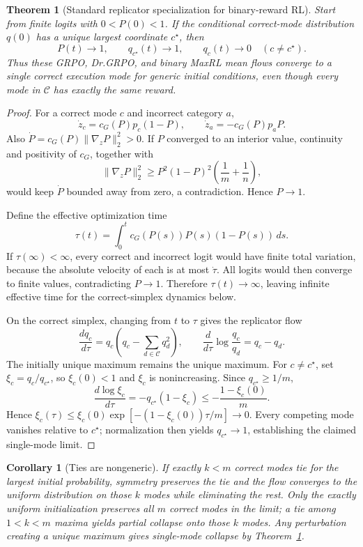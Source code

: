 \documentclass{article}
\newcommand{\1}{\mathbf 1}
\newtheorem{theorem}[lemma]{Theorem}
\newtheorem{corollary}[lemma]{Corollary}
\theoremstyle{remark}
\theoremstyle{definition}
\theoremstyle{plain}
\begin{document}
\begin{theorem}[Standard replicator specialization for binary-reward RL]
\label{thm:grpo-collapse}
Start from finite logits with $0<P(0)<1$. If the conditional correct-mode
distribution $q(0)$ has a unique largest coordinate $c^\star$, then
\[
  P(t)\longrightarrow1,
  \qquad
  q_{c^\star}(t)\longrightarrow1,
  \qquad
  q_c(t)\longrightarrow0\quad(c\ne c^\star).
\]
Thus these GRPO, Dr.GRPO, and binary MaxRL mean flows converge to a single
correct execution mode for generic initial conditions, even though every mode
in $\mathcal C$ has exactly the same reward.
\end{theorem}

\begin{proof}
For a correct mode $c$ and incorrect category $a$,
\[
  \dot z_c=c_G(P)p_c(1-P),
  \qquad
  \dot z_a=-c_G(P)p_aP.
\]
Also $\dot P=c_G(P)\lVert\nabla_zP\rVert_2^2>0$. If $P$ converged to an
interior value, continuity and positivity of $c_G$, together with
\[
 \lVert\nabla_zP\rVert_2^2
 \ge P^2(1-P)^2\left(\frac1m+\frac1n\right),
\]
would keep $\dot P$ bounded away from zero, a contradiction. Hence $P\to1$.

Define the effective optimization time
\[
  \tau(t)=\int_0^t c_G(P(s))P(s)(1-P(s))\,ds.
\]
If $\tau(\infty)<\infty$, every correct and incorrect logit would have finite
total variation, because the absolute velocity of each is at most $\dot\tau$.
All logits would then converge to finite values, contradicting $P\to1$.
Therefore $\tau(t)\to\infty$, leaving infinite effective time for the
correct-simplex dynamics below.

On the correct simplex, changing from $t$ to $\tau$ gives the replicator flow
\begin{equation}
  \frac{dq_c}{d\tau}
  =q_c\left(q_c-\sum_{d\in\mathcal C}q_d^2\right),
  \qquad
  \frac{d}{d\tau}\log\frac{q_c}{q_d}=q_c-q_d.
  \label{eq:grpo-replicator}
\end{equation}
The initially unique maximum remains the unique maximum. For $c\ne c^\star$,
set $\xi_c=q_c/q_{c^\star}$, so $\xi_c(0)<1$ and $\xi_c$ is nonincreasing.
Since $q_{c^\star}\ge1/m$,
\[
 \frac{d\log\xi_c}{d\tau}
 =-q_{c^\star}(1-\xi_c)
 \le-\frac{1-\xi_c(0)}{m}.
\]
Hence $\xi_c(\tau)\le\xi_c(0)\exp[-(1-\xi_c(0))\tau/m]\to0$.
Every competing mode vanishes relative to $c^\star$; normalization then
yields $q_{c^\star}\to1$, establishing the claimed single-mode limit.
\end{proof}

\begin{corollary}[Ties are nongeneric]
\label{cor:grpo-ties}
If exactly $k<m$ correct modes tie for the largest initial probability, symmetry
preserves the tie and the flow converges to the uniform distribution on those
$k$ modes while eliminating the rest. Only the exactly uniform initialization preserves all $m$ correct modes
in the limit; a tie among $1<k<m$ maxima yields partial collapse onto those
$k$ modes. Any perturbation creating a unique maximum gives single-mode
collapse by Theorem~\ref{thm:grpo-collapse}.
\end{corollary}
\end{document}

